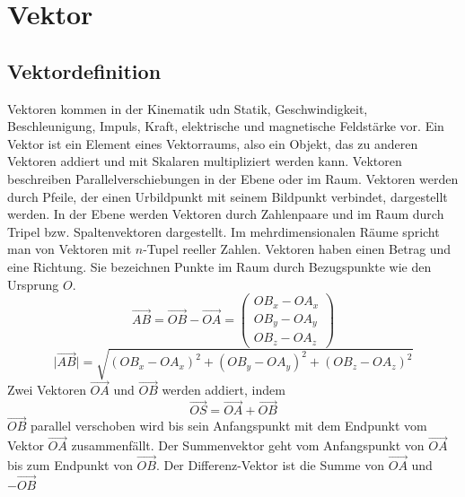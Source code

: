 \section{Vektor}
\subsection{Vektordefinition}
Vektoren kommen in der Kinematik udn Statik, Geschwindigkeit, Beschleunigung, Impuls, Kraft, elektrische und magnetische Feldstärke vor.
\newline\newline
Ein Vektor ist ein Element eines Vektorraums, also ein Objekt, das zu anderen Vektoren addiert und mit Skalaren multipliziert werden kann. Vektoren beschreiben Parallelverschiebungen in der Ebene oder im Raum. Vektoren werden durch Pfeile, der einen Urbildpunkt mit seinem Bildpunkt verbindet, dargestellt werden. In der Ebene werden Vektoren durch Zahlenpaare und im Raum durch Tripel bzw. Spaltenvektoren dargestellt. Im mehrdimensionalen Räume spricht man von Vektoren mit $n$-Tupel reeller Zahlen.
\newline\newline
Vektoren haben einen Betrag und eine Richtung. Sie bezeichnen Punkte im Raum durch Bezugspunkte wie den Ursprung $O$.
\begin{equation}
\boxed{\overrightarrow{AB}=\overrightarrow{OB}-\overrightarrow{OA}=\begin{pmatrix}OB_x-OA_x\\OB_y-OA_y\\OB_z-OA_z\end{pmatrix}}
\end{equation}
\begin{equation}
\boxed{\vert \overrightarrow{AB}\vert=\sqrt{(OB_x-OA_x)^2+(OB_y-OA_y)^2+(OB_z-OA_z)^2}}
\end{equation}
Zwei Vektoren $\overrightarrow{OA}$ und $\overrightarrow{OB}$ werden addiert, indem
\begin{equation}
\boxed{\overrightarrow{OS}=\overrightarrow{OA}+\overrightarrow{OB}}
\end{equation}
$\overrightarrow{OB}$ parallel verschoben wird bis sein Anfangspunkt mit dem Endpunkt vom Vektor $\overrightarrow{OA}$ zusammenfällt. Der Summenvektor geht vom Anfangspunkt von $\overrightarrow{OA}$ bis zum Endpunkt von $\overrightarrow{OB}$.
\newline\newline
Der Differenz-Vektor ist die Summe von $\overrightarrow{OA}$ und $-\overrightarrow{OB}$
